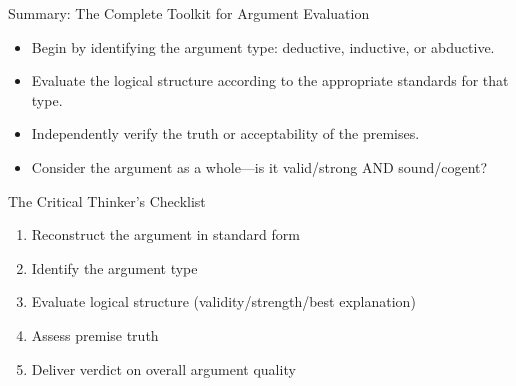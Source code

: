 \documentclass{beamer}
\begin{document}
\begin{frame}{Summary: The Complete Toolkit for Argument Evaluation}
    \begin{itemize}
        \item Begin by identifying the argument type: deductive, inductive, or abductive.
        \item Evaluate the logical structure according to the appropriate standards for that type.
        \item Independently verify the truth or acceptability of the premises.
        \item Consider the argument as a whole—is it valid/strong AND sound/cogent?
    \end{itemize}
    
    \begin{block}{The Critical Thinker's Checklist}
        \begin{enumerate}
            \item Reconstruct the argument in standard form
            \item Identify the argument type
            \item Evaluate logical structure (validity/strength/best explanation)
            \item Assess premise truth
            \item Deliver verdict on overall argument quality
        \end{enumerate}
    \end{block}
\end{frame}
\end{document}
